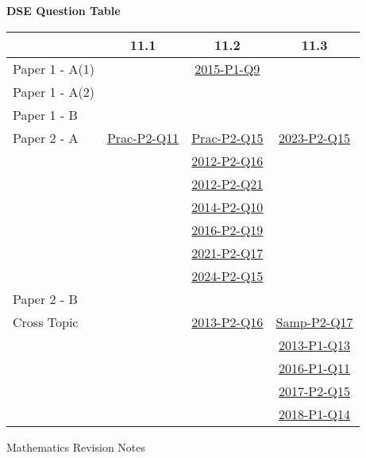 \documentclass[12pt, a4paper]{article}
\begin{document}
\begin{absolutelynopagebreak}
\begin{center}
\textbf{DSE Question Table}
\end{center}
\begin{center}
\begin{tabular}{|l|c|c|c|}
\hline
        & 11.1 & 11.2 & 11.3 \\\hline
\hline
Paper 1 - A(1)&  & \hyperref[DSE2015-CoreP1-Q09]{2015-P1-Q9} &  \\
\hline
Paper 1 - A(2)&  &  &  \\
\hline
Paper 1 - B&  &  &  \\
\hline
\hline
Paper 2 - A& \hyperref[DSE2012P-CoreP2-Q11]{Prac-P2-Q11} & \hyperref[DSE2012P-CoreP2-Q15]{Prac-P2-Q15} & \hyperref[DSE2023-CoreP2-Q15]{2023-P2-Q15} \\
&  & \hyperref[DSE2012-CoreP2-Q16]{2012-P2-Q16} &  \\
&  & \hyperref[DSE2012-CoreP2-Q21]{2012-P2-Q21} &  \\
&  & \hyperref[DSE2014-CoreP2-Q10]{2014-P2-Q10} &  \\
&  & \hyperref[DSE2016-CoreP2-Q19]{2016-P2-Q19} &  \\
&  & \hyperref[DSE2021-CoreP2-Q17]{2021-P2-Q17} &  \\
&  & \hyperref[DSE2024-CoreP2-Q15]{2024-P2-Q15} &  \\
\hline
Paper 2 - B&  &  &  \\
\hline
\hline
Cross Topic&  & \hyperref[DSE2013-CoreP2-Q16]{2013-P2-Q16} & \hyperref[DSE2012S-CoreP2-Q17]{Samp-P2-Q17} \\
&  &  & \hyperref[DSE2013-CoreP1-Q13]{2013-P1-Q13} \\
&  &  & \hyperref[DSE2016-CoreP1-Q11]{2016-P1-Q11} \\
&  &  & \hyperref[DSE2017-CoreP2-Q15]{2017-P2-Q15} \\
&  &  & \hyperref[DSE2018-CoreP1-Q14]{2018-P1-Q14} \\
\hline
\end{tabular}
\end{center}
\end{absolutelynopagebreak}
\newpage
\newpage
\thispagestyle{empty}
\begin{center}
Mathematics Revision Notes\\\vspace{1cm}
\\\vspace{1cm}
{\fontsize{24pt}{24pt}\selectfont {Trigonometric Ratios}} \\\vspace{1cm}
\label{chapter:S2-12}

\end{center}
\vspace{0.5cm}
\hline
\end{document}
